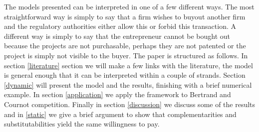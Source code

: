 The models presented can be interpreted in one of a few different ways. The most straightforward way is simply to say that a firm wishes to buyout another firm and the regulatory authorities either allow this or forbid this transaction. A different way is simply to say that the entrepreneur cannot be bought out because the projects are not purchasable, perhaps they are not patented or the project is simply not visible to the buyer. 
The paper is structured as follows. 
In section \ref{literature} section we will make a few links with the literature, the model is general enough that it can be interpreted within a couple of strands. Section \ref{dynamic} will present the model and the results, finishing with a brief numerical example. In section \ref{application} we apply the framework to Bertrand and Cournot competition. Finally in section \ref{discussion} we discuss some of the results and in \ref{static} we give a brief argument to show that complementarities and substitutabilities yield the same willingness to pay.
